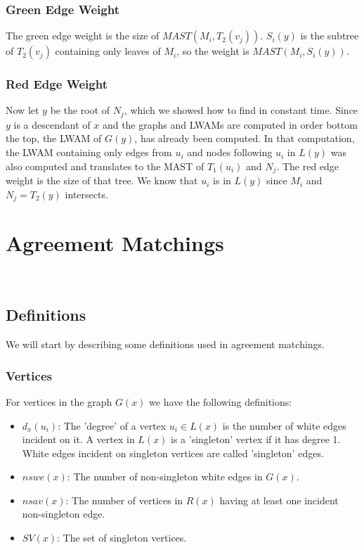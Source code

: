 \subsubsection{Green Edge Weight}
The green edge weight is the size of $MAST(M_i,T_2(v_j))$. $S_i(y)$ is the subtree of $T_2(v_j)$ containing only leaves of $M_i$, so the weight is $MAST(M_i, S_i(y))$.

\subsubsection{Red Edge Weight}
Now let $y$ be the root of $N_j$, which we showed how to find in constant time. Since $y$ is a descendant of $x$ and the graphs and LWAMs are computed in order bottom the top, the LWAM of $G(y)$, has already been computed. In that computation, the LWAM containing only edges from $u_i$ and nodes following $u_i$ in $L(y)$ was also computed and translates to the MAST of $T_1(u_i)$ and $N_j$. The red edge weight is the size of that tree. We know that $u_i$ is in $L(y)$ since $M_i$ and $N_j = T_2(y)$ intersects.

\section{Agreement Matchings}
\\

\subsection{Definitions}
We will start by describing some definitions used in agreement matchings.

\subsubsection{Vertices}
For vertices in the graph $G(x)$ we have the following definitions:
\begin{itemize}
	\item $d_x(u_i)$: The 'degree' of a vertex $u_i \in L(x)$ is the number of white edges incident on it.
	\subitem A vertex in $L(x)$ is a 'singleton' vertex if it has degree 1.
	\subitem White edges incident on singleton vertices are called 'singleton' edges.
	\item $nswe(x)$: The number of non-singleton white edges in $G(x)$.
	\item $nsav(x)$: The number of vertices in $R(x)$ having at least one incident non-singleton edge.
	\item $SV(x)$: The set of singleton vertices.
\end{itemize}

